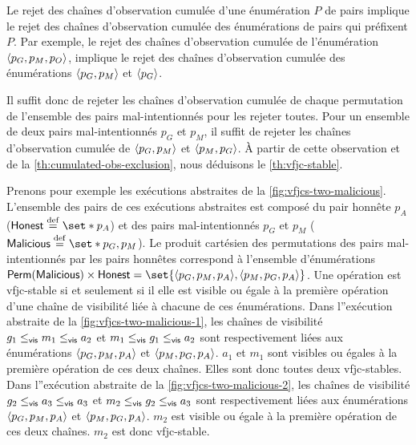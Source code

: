 Le rejet des chaînes d'observation cumulée d'une énumération $P$ de pairs implique le rejet des chaînes d'observation cumulée des énumérations de pairs qui préfixent $P$.
Par exemple, le rejet des chaînes d'observation cumulée de l'énumération $\tuple*{p_G, p_M, p_O}$, implique le rejet des chaînes d'observation cumulée des énumérations $\tuple*{p_G, p_M}$ et $\tuple*{p_G}$.

Il suffit donc de rejeter les chaînes d'observation cumulée de chaque permutation de l'ensemble des pairs mal-intentionnés pour les rejeter toutes.
Pour un ensemble de deux pairs mal-intentionnés $p_G$ et $p_M$, il suffit de rejeter les chaînes d'observation cumulée de $\tuple*{p_G, p_M}$ et $\tuple*{p_M, p_G}$.
À partir de cette observation et de la \autoref{th:cumulated-obs-exclusion}, nous déduisons le \autoref{th:vfjc-stable}.

Prenons pour exemple les exécutions abstraites de la \autoref{fig:vfjcs-two-malicious}.
L'ensemble des pairs de ces exécutions abstraites est composé du pair honnête $p_A$ ($\trm{Honest} \defeq \set*{p_A}$) et des pairs mal-intentionnés $p_G$ et $p_M$ ($\trm{Malicious} \defeq \set*{p_G, p_M}$).
Le produit cartésien des permutations des pairs mal-intentionnés par les pairs honnêtes correspond à l'ensemble d'énumérations $\trm{Perm}(\trm{Malicious}) \times \trm{Honest} = \set{\tuple*{p_G, p_M, p_A}, \tuple*{p_M, p_G, p_A}}$.
Une opération est vfjc-stable si et seulement si il elle est visible ou égale à la première opération d'une chaîne de visibilité liée à chacune de ces énumérations.
Dans l''exécution abstraite de la \autoref{fig:vfjcs-two-malicious-1}, les chaînes de visibilité $g_1 \viseq m_1 \viseq a_2$ et $m_1 \viseq g_1 \viseq a_2$ sont respectivement liées aux énumérations $\tuple*{p_G, p_M, p_A}$ et $\tuple*{p_M, p_G, p_A}$.
$a_1$ et $m_1$ sont visibles ou égales à la première opération de ces deux chaînes.
Elles sont donc toutes deux vfjc-stables.
Dans l''exécution abstraite de la \autoref{fig:vfjcs-two-malicious-2}, les chaînes de visibilité $g_2 \viseq a_3 \viseq a_3$ et $m_2 \viseq g_2 \viseq a_3$ sont respectivement liées aux énumérations $\tuple*{p_G, p_M, p_A}$ et $\tuple*{p_M, p_G, p_A}$.
$m_2$ est visible ou égale à la première opération de ces deux chaînes.
$m_2$ est donc vfjc-stable.

